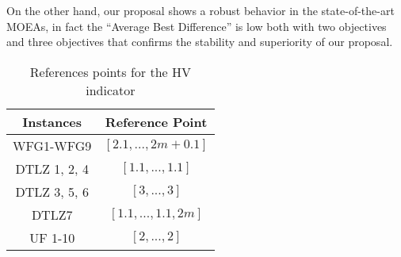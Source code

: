 On the other hand, our proposal shows a robust behavior in the state-of-the-art MOEAs, in fact the ``Average Best Difference'' is low both with two objectives and three objectives that confirms the stability and superiority of our proposal.
%
\begin{table}[t]
\centering
\scriptsize
\caption{References points for the HV indicator}
\label{tab:ReferencePoints}
\begin{tabular}{cc}
\hline
\textbf{Instances} & \textbf{Reference Point} \\ \hline
WFG1-WFG9 & $[2.1, ...,2m+0.1]$ \\
DTLZ 1, 2, 4 & $[1.1, ..., 1.1]$ \\
DTLZ 3, 5, 6 & $[3, ..., 3]$ \\
DTLZ7 & $[1.1, ..., 1.1, 2m]$ \\
UF 1-10 & $[2, ..., 2]$ \\ \hline
\end{tabular}
\end{table}
